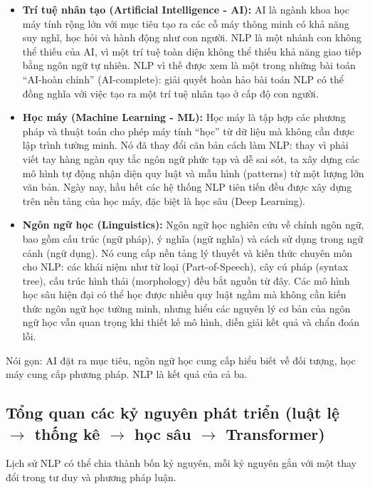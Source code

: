 \begin{itemize}
    \item \textbf{Trí tuệ nhân tạo (Artificial Intelligence - AI):} AI là ngành khoa học máy tính rộng lớn với mục tiêu tạo ra các cỗ máy thông minh có khả năng suy nghĩ, học hỏi và hành động như con người. NLP là một nhánh con không thể thiếu của AI, vì một trí tuệ toàn diện không thể thiếu khả năng giao tiếp bằng ngôn ngữ tự nhiên. NLP vì thế được xem là một trong những bài toán “AI-hoàn chỉnh” (AI-complete): giải quyết hoàn hảo bài toán NLP có thể đồng nghĩa với việc tạo ra một trí tuệ nhân tạo ở cấp độ con người.
    
    \item \textbf{Học máy (Machine Learning - ML):} Học máy là tập hợp các phương pháp và thuật toán cho phép máy tính “học” từ dữ liệu mà không cần được lập trình tường minh. Nó đã thay đổi căn bản cách làm NLP: thay vì phải viết tay hàng ngàn quy tắc ngôn ngữ phức tạp và dễ sai sót, ta xây dựng các mô hình tự động nhận diện quy luật và mẫu hình (patterns) từ một lượng lớn văn bản. Ngày nay, hầu hết các hệ thống NLP tiên tiến đều được xây dựng trên nền tảng của học máy, đặc biệt là học sâu (Deep Learning).
    
    \item \textbf{Ngôn ngữ học (Linguistics):} Ngôn ngữ học nghiên cứu về chính ngôn ngữ, bao gồm cấu trúc (ngữ pháp), ý nghĩa (ngữ nghĩa) và cách sử dụng trong ngữ cảnh (ngữ dụng). Nó cung cấp nền tảng lý thuyết và kiến thức chuyên môn cho NLP: các khái niệm như từ loại (Part-of-Speech), cây cú pháp (syntax tree), cấu trúc hình thái (morphology) đều bắt nguồn từ đây. Các mô hình học sâu hiện đại có thể học được nhiều quy luật ngầm mà không cần kiến thức ngôn ngữ học tường minh, nhưng hiểu các nguyên lý cơ bản của ngôn ngữ học vẫn quan trọng khi thiết kế mô hình, diễn giải kết quả và chẩn đoán lỗi.
\end{itemize}

Nói gọn: AI đặt ra mục tiêu, ngôn ngữ học cung cấp hiểu biết về đối tượng, học máy cung cấp phương pháp. NLP là kết quả của cả ba.

\subsection{Tổng quan các kỷ nguyên phát triển (luật lệ \(\rightarrow\) thống kê \(\rightarrow\) học sâu \(\rightarrow\) Transformer)}
\label{ssec:ky_nguyen_phat_trien}

Lịch sử NLP có thể chia thành bốn kỷ nguyên, mỗi kỷ nguyên gắn với một thay đổi trong tư duy và phương pháp luận.

